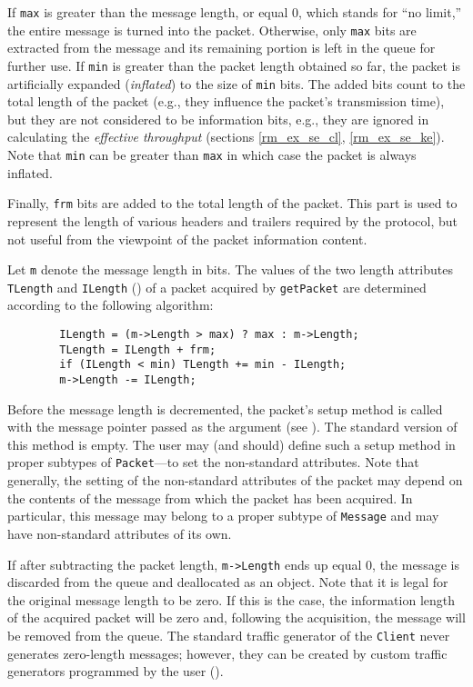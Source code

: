 If {\tt max} is greater than the message length, or equal 0, which stands
for ``no limit,'' the entire message is turned into the packet.
Otherwise, only {\tt max} bits are extracted from the message
and its remaining portion is left in the queue for further use.
If {\tt min} is greater than the packet length obtained so far, the packet is
artificially expanded ({\em inflated\/}) to the size of {\tt min}
bits.
The added bits count to the total length of the packet (e.g.,
they influence the packet's transmission time), but they are
not considered to be information bits, e.g., they are ignored in calculating
the {\em effective throughput\/}
(sections \ref{rm_ex_se_cl}, \ref{rm_ex_se_ke}).
Note that {\tt min} can be greater than {\tt max} in which case the packet
is always inflated.

Finally, {\tt frm} bits are added to the total length of the packet.
This part is used to represent the length of various headers and trailers
required by the protocol, but not useful from the viewpoint of the
packet information content.

Let {\tt m} denote the message length in bits.
The values of the two length attributes {\tt TLength} and {\tt ILength}
()
of a packet acquired by {\tt getPacket}
are determined according to the following algorithm:
\begin{verbatim}
        ILength = (m->Length > max) ? max : m->Length;
        TLength = ILength + frm;
        if (ILength < min) TLength += min - ILength;
        m->Length -= ILength;
\end{verbatim}

Before the message length is decremented, the packet's setup method is
called with the message pointer passed as the argument (see ).
The standard version of this method is empty.
The user may (and should) define such a setup method in proper subtypes of
{\tt Packet}---to set the non-standard attributes.
Note that generally, the setting of the non-standard attributes of the packet
may depend on the contents of the message from which the packet has been
acquired.
In particular, this message may belong to a proper subtype of {\tt Message}
and may have non-standard attributes of its own.

If after subtracting the packet length, {\tt m->Length} ends up equal 0,
the message is discarded from the queue and deallocated as an object.
Note that it is legal for the original message length to be zero.
If this is the case, the information length of the acquired packet will be
zero and, following the acquisition, the message will be removed from the
queue.
The standard traffic generator of the {\tt Client} never generates zero-length
messages; however, they can be created by custom traffic generators programmed
by the user ().

